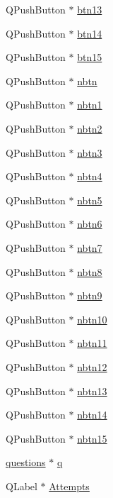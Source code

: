 \begin{DoxyCompactItemize}
\item 
Q\+Push\+Button $\ast$ \hyperlink{classbattleshipgame_ab4d54be75fe7a33f9cad9fd9133c9c68}{btn13}
\item 
Q\+Push\+Button $\ast$ \hyperlink{classbattleshipgame_a8f8efa2c92d0b769a8078e9ada3ee598}{btn14}
\item 
Q\+Push\+Button $\ast$ \hyperlink{classbattleshipgame_a006b98c3715ed12d9b0946b5a324b216}{btn15}
\item 
Q\+Push\+Button $\ast$ \hyperlink{classbattleshipgame_a4fe785089034383ef32e123b1d610c9a}{nbtn}
\item 
Q\+Push\+Button $\ast$ \hyperlink{classbattleshipgame_a2e5c5e3c321e727123ef1fcbbd0a844e}{nbtn1}
\item 
Q\+Push\+Button $\ast$ \hyperlink{classbattleshipgame_ae1cba72b70f6c90d1aa6a92790e3866e}{nbtn2}
\item 
Q\+Push\+Button $\ast$ \hyperlink{classbattleshipgame_ae43d174d00e9f9be7339d36bb731098d}{nbtn3}
\item 
Q\+Push\+Button $\ast$ \hyperlink{classbattleshipgame_a999e59408f4a693eae797578d425ebe9}{nbtn4}
\item 
Q\+Push\+Button $\ast$ \hyperlink{classbattleshipgame_ae64f5a6a90c8aa1c63a4d29056988f82}{nbtn5}
\item 
Q\+Push\+Button $\ast$ \hyperlink{classbattleshipgame_a85fa88b36334f203003b3b435971d028}{nbtn6}
\item 
Q\+Push\+Button $\ast$ \hyperlink{classbattleshipgame_a8ea2750b47be5c760cd70e272bc3dbd4}{nbtn7}
\item 
Q\+Push\+Button $\ast$ \hyperlink{classbattleshipgame_ae95e70dbe7f545b7a423c96abfc57c69}{nbtn8}
\item 
Q\+Push\+Button $\ast$ \hyperlink{classbattleshipgame_a4ec1a99e13fc3329da77de9f662a5ebb}{nbtn9}
\item 
Q\+Push\+Button $\ast$ \hyperlink{classbattleshipgame_a93a5b6d3dacc8b527a12a0cd831a63cc}{nbtn10}
\item 
Q\+Push\+Button $\ast$ \hyperlink{classbattleshipgame_a3ec68ea66baca163feb4e234d1db0148}{nbtn11}
\item 
Q\+Push\+Button $\ast$ \hyperlink{classbattleshipgame_ad5eba575783a6be5174f4bfa54ecc90d}{nbtn12}
\item 
Q\+Push\+Button $\ast$ \hyperlink{classbattleshipgame_a4a663ea0a0c4c8abfdcb706a00f1a1e6}{nbtn13}
\item 
Q\+Push\+Button $\ast$ \hyperlink{classbattleshipgame_a9f66db04b6686409650f804299088df0}{nbtn14}
\item 
Q\+Push\+Button $\ast$ \hyperlink{classbattleshipgame_a36f0e1987c825baf3eb5bba127d4ad62}{nbtn15}
\item 
\hyperlink{classquestions}{questions} $\ast$ \hyperlink{classbattleshipgame_a16d16fa67a06243ed667671d0e4603f7}{q}
\item 
Q\+Label $\ast$ \hyperlink{classbattleshipgame_ac313ece1b979ec98cbaf3a62286db252}{Attempts}
\end{DoxyCompactItemize}



